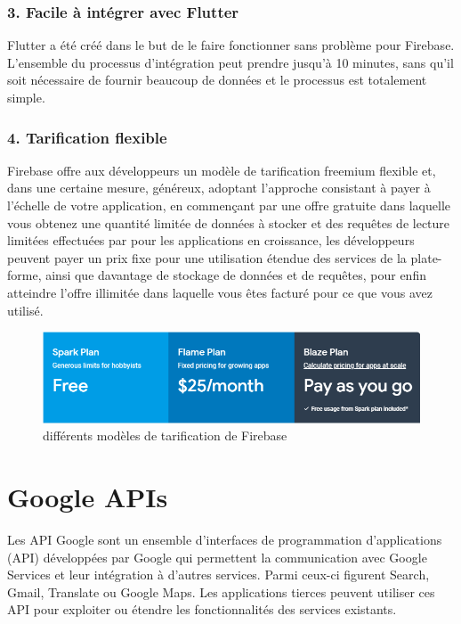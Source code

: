 \subsubsection{3. Facile à intégrer avec Flutter}
Flutter a été créé dans le but de le faire fonctionner sans problème pour Firebase. L'ensemble du processus d'intégration peut prendre jusqu'à 10 minutes, sans qu'il soit nécessaire de fournir beaucoup de données et le processus est totalement simple.\cite{noauthor_using_nodate}

\subsubsection{4. Tarification flexible}
Firebase offre aux développeurs un modèle de tarification \gls{freemium} flexible et, dans une certaine mesure, généreux, adoptant l’approche consistant à payer à l’échelle de votre application, en commençant par une offre gratuite dans laquelle vous obtenez une quantité limitée de données à stocker et des requêtes de lecture limitées effectuées par pour les applications en croissance, les développeurs peuvent payer un prix fixe pour une utilisation étendue des services de la plate-forme, ainsi que davantage de stockage de données et de requêtes, pour enfin atteindre l'offre illimitée dans laquelle vous êtes facturé pour ce que vous avez utilisé.\cite{noauthor_firebase_nodate}\bigskip

\begin{figure}[h]
	\begin{center}
		\includegraphics[width=14cm]{Images/chapter2/firebase_pricing_offers.png}
		\caption{{\footnotesize différents modèles de tarification de Firebase}}
	\end{center}
\end{figure}
\newpage

\section{Google APIs}
Les API Google sont un ensemble d'interfaces de programmation d'applications (API) développées par Google qui permettent la communication avec Google Services et leur intégration à d'autres services. Parmi ceux-ci figurent Search, Gmail, Translate ou Google Maps. Les applications tierces peuvent utiliser ces API pour exploiter ou étendre les fonctionnalités des services existants.

